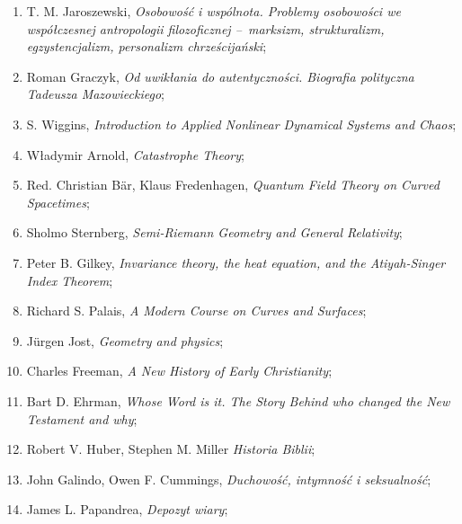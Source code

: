 \documentclass[a4paper,11pt]{article}
\begin{document}
\begin{enumerate}
\item T. M. Jaroszewski, \emph{Osobowość i wspólnota. Problemy
    osobowości we współczesnej antropologii filozoficznej --~marksizm,
    strukturalizm, egzystencjalizm, personalizm chrześcijański};

\item Roman Graczyk, \emph{Od uwikłania do autentyczności. Biografia
    polityczna Tadeusza Mazowieckiego};

\item S. Wiggins, \emph{Introduction to Applied Nonlinear Dynamical
    Systems and Chaos};

\item Władymir Arnold, \emph{Catastrophe Theory};

\item Red. Christian B\"{a}r, Klaus Fredenhagen, \emph{Quantum Field
    Theory on Curved Spacetimes};

\item Sholmo Sternberg, \emph{Semi-Riemann Geometry and General
    Relativity};

\item Peter B. Gilkey, \emph{Invariance theory, the heat equation, and
    the Atiyah-Singer Index Theorem};

\item Richard S. Palais, \emph{A Modern Course on Curves and
    Surfaces};

\item J\"{u}rgen Jost, \emph{Geometry and physics};

\item Charles Freeman, \emph{A New History of Early Christianity};

\item Bart D. Ehrman, \emph{Whose Word is it. The Story Behind who
    changed the New Testament and why};

\item Robert V. Huber, Stephen M. Miller \emph{Historia Biblii};

\item John Galindo, Owen F. Cummings, \emph{Duchowość, intymność i
    seksualność};

\item James L. Papandrea, \emph{Depozyt wiary};





\end{enumerate}
\end{document}
